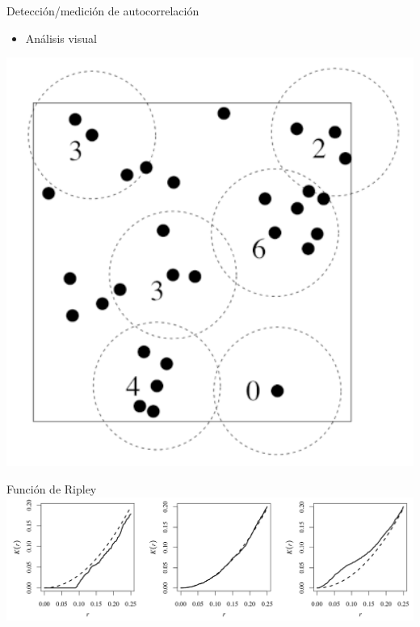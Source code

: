\documentclass[
  11pt,
  ignorenonframetext,
]{beamer}
\providecommand{\tightlist}{%
  \setlength{\itemsep}{0pt}\setlength{\parskip}{0pt}}
\begin{document}
\begin{frame}{Detección/medición de autocorrelación}
\protect\hypertarget{detecciuxf3nmediciuxf3n-de-autocorrelaciuxf3n}{}
\begin{itemize}
\tightlist
\item
  Análisis visual
\end{itemize}

\begin{center}\includegraphics[width=5.56in]{Figuras/Cuenta-vecinos} \end{center}
\end{frame}

\begin{frame}{Función de Ripley}
\protect\hypertarget{funciuxf3n-de-ripley}{}
\includegraphics[width=24.15in]{Figuras/K-Ripley}
\end{frame}
\end{document}
